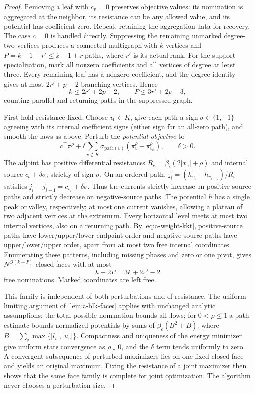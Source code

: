 \begin{proof}
Removing a leaf with $c_v=0$ preserves objective values: its nomination
is aggregated at the neighbor, its resistance can be any allowed value,
and its potential has coefficient zero. Repeat, retaining the aggregation
data for recovery. The case $c=0$ is handled directly. Suppressing the
remaining unmarked degree-two vertices produces a connected multigraph
with $k$ vertices and
$P=k-1+r'\le k-1+r$ paths, where $r'$ is its actual rank.
For the support specialization, mark all nonzero coefficients and all
vertices of degree at least three. Every remaining leaf has a nonzero
coefficient, and the degree identity gives at most $2r'+p-2$ branching
vertices. Hence
\[
 k\le2r'+2p-2,\qquad P\le3r'+2p-3,
\]
counting parallel and returning paths in the suppressed graph.

First hold resistance fixed. Choose $v_0\in K$, give each path a sign
$\sigma\in\{1,-1\}$ agreeing with its internal coefficient signs
(either sign for an all-zero path), and smooth the laws as above.
Perturb the \emph{potential objective} to
\[
 c^\top\pi^\rho+
 \delta\sum_{v\notin K}\sigma_{\mathrm{path}(v)}
                    (\pi_v^\rho-\pi_{v_0}^\rho),\qquad \delta>0.
\]
The adjoint has positive differential resistances
$R_e=\beta_e(2|x_e|+\rho)$ and internal source
$c_v+\delta\sigma$, strictly of sign $\sigma$. On an ordered path,
$j_i=(h_{v_i}-h_{v_{i+1}})/R_i$ satisfies
$j_i-j_{i-1}=c_{v_i}+\delta\sigma$.
Thus the currents strictly increase on positive-source paths and
strictly decrease on negative-source paths. The potential $h$ has a
single peak or valley, respectively; at most one current vanishes,
allowing a plateau of two adjacent vertices at the extremum. Every
horizontal level meets at most two internal vertices, also on a
returning path. By \cref{eq:a-weight-kkt}, positive-source paths have
lower/upper/lower endpoint order and negative-source paths have
upper/lower/upper order, apart from at most two free internal coordinates.
Enumerating these patterns, including missing phases and zero or one
pivot, gives $N^{O(k+P)}$ closed faces with at most
\[
 k+2P=3k+2r'-2
\]
free nominations. Marked coordinates are left free.

This family is independent of both perturbations and of resistance.
The uniform limiting argument of \cref{lem:a-blk-faces} applies with
unchanged analytic assumptions: the total possible nomination bounds
all flows; for $0<\rho\le1$ a path estimate bounds normalized potentials
by sums of $\beta_e(B^2+B)$, where $B=\sum_v\max\{|l_v|,|u_v|\}$.
Compactness and uniqueness of the energy minimizer give uniform state
convergence as $\rho\downarrow0$, and the $\delta$ term tends uniformly
to zero. A convergent subsequence of perturbed maximizers lies on one
fixed closed face and yields an original maximum. Fixing the resistance
of a joint maximizer then shows that the same face family is complete
for joint optimization. The algorithm never chooses a perturbation size.


\end{proof}
